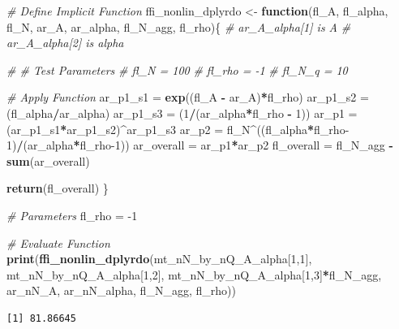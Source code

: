 \documentclass[
]{book}
\newenvironment{Shaded}{\begin{snugshade}}{\end{snugshade}}
\newcommand{\CommentTok}[1]{\textcolor[rgb]{0.56,0.35,0.01}{\textit{#1}}}
\newcommand{\ControlFlowTok}[1]{\textcolor[rgb]{0.13,0.29,0.53}{\textbf{#1}}}
\newcommand{\DecValTok}[1]{\textcolor[rgb]{0.00,0.00,0.81}{#1}}
\newcommand{\KeywordTok}[1]{\textcolor[rgb]{0.13,0.29,0.53}{\textbf{#1}}}
\newcommand{\NormalTok}[1]{#1}
\newcommand{\OperatorTok}[1]{\textcolor[rgb]{0.81,0.36,0.00}{\textbf{#1}}}
\newcommand{\StringTok}[1]{\textcolor[rgb]{0.31,0.60,0.02}{#1}}
\begin{document}
\begin{Shaded}
\begin{Highlighting}[]
\CommentTok{# Define Implicit Function}
\NormalTok{ffi_nonlin_dplyrdo <-}\StringTok{ }\ControlFlowTok{function}\NormalTok{(fl_A, fl_alpha, fl_N, ar_A, ar_alpha, fl_N_agg, fl_rho)\{}
  \CommentTok{# ar_A_alpha[1] is A}
  \CommentTok{# ar_A_alpha[2] is alpha}

  \CommentTok{# # Test Parameters}
  \CommentTok{# fl_N = 100}
  \CommentTok{# fl_rho = -1}
  \CommentTok{# fl_N_q = 10}

  \CommentTok{# Apply Function}
\NormalTok{  ar_p1_s1 =}\StringTok{ }\KeywordTok{exp}\NormalTok{((fl_A }\OperatorTok{-}\StringTok{ }\NormalTok{ar_A)}\OperatorTok{*}\NormalTok{fl_rho)}
\NormalTok{  ar_p1_s2 =}\StringTok{ }\NormalTok{(fl_alpha}\OperatorTok{/}\NormalTok{ar_alpha)}
\NormalTok{  ar_p1_s3 =}\StringTok{ }\NormalTok{(}\DecValTok{1}\OperatorTok{/}\NormalTok{(ar_alpha}\OperatorTok{*}\NormalTok{fl_rho }\OperatorTok{-}\StringTok{ }\DecValTok{1}\NormalTok{))}
\NormalTok{  ar_p1 =}\StringTok{ }\NormalTok{(ar_p1_s1}\OperatorTok{*}\NormalTok{ar_p1_s2)}\OperatorTok{^}\NormalTok{ar_p1_s3}
\NormalTok{  ar_p2 =}\StringTok{ }\NormalTok{fl_N}\OperatorTok{^}\NormalTok{((fl_alpha}\OperatorTok{*}\NormalTok{fl_rho}\DecValTok{-1}\NormalTok{)}\OperatorTok{/}\NormalTok{(ar_alpha}\OperatorTok{*}\NormalTok{fl_rho}\DecValTok{-1}\NormalTok{))}
\NormalTok{  ar_overall =}\StringTok{ }\NormalTok{ar_p1}\OperatorTok{*}\NormalTok{ar_p2}
\NormalTok{  fl_overall =}\StringTok{ }\NormalTok{fl_N_agg }\OperatorTok{-}\StringTok{ }\KeywordTok{sum}\NormalTok{(ar_overall)}

  \KeywordTok{return}\NormalTok{(fl_overall)}
\NormalTok{\}}

\CommentTok{# Parameters}
\NormalTok{fl_rho =}\StringTok{ }\DecValTok{-1}

\CommentTok{# Evaluate Function}
\KeywordTok{print}\NormalTok{(}\KeywordTok{ffi_nonlin_dplyrdo}\NormalTok{(mt_nN_by_nQ_A_alpha[}\DecValTok{1}\NormalTok{,}\DecValTok{1}\NormalTok{],}
\NormalTok{                         mt_nN_by_nQ_A_alpha[}\DecValTok{1}\NormalTok{,}\DecValTok{2}\NormalTok{],}
\NormalTok{                         mt_nN_by_nQ_A_alpha[}\DecValTok{1}\NormalTok{,}\DecValTok{3}\NormalTok{]}\OperatorTok{*}\NormalTok{fl_N_agg,}
\NormalTok{                         ar_nN_A, ar_nN_alpha, fl_N_agg, fl_rho))}
\end{Highlighting}
\end{Shaded}

\begin{verbatim}
[1] 81.86645
\end{verbatim}
\end{document}
